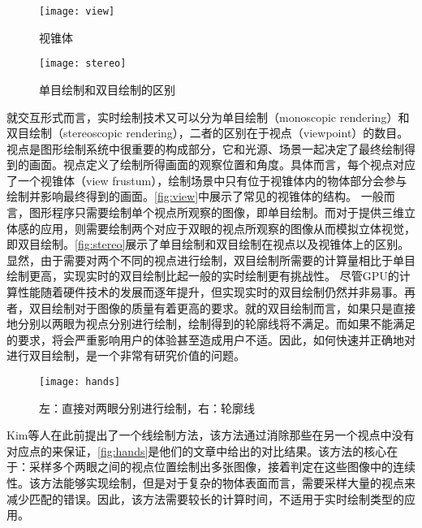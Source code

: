 \begin{figure}[tbh]
    \centering
    \texttt{[image: view]}
    \caption[视锥体]{\label{fig:view}
    视锥体\footnotemark}
\end{figure}

\begin{figure}[tbh]
    \centering
    \texttt{[image: stereo]}
    \caption[单目绘制和双目绘制的区别]{\label{fig:stereo}
    单目绘制和双目绘制的区别\footnotemark}
\end{figure}

就交互形式而言，实时绘制技术又可以分为单目绘制（monoscopic rendering）和双目绘制（stereoscopic rendering），二者的区别在于视点（viewpoint）的数目。视点是图形绘制系统中很重要的构成部分，它和光源、场景一起决定了最终绘制得到的画面。视点定义了绘制所得画面的观察位置和角度。具体而言，每个视点对应了一个视锥体（view frustum），绘制场景中只有位于视锥体内的物体部分会参与绘制并影响最终得到的画面。\autoref{fig:view}中展示了常见的视锥体的结构。
一般而言，图形程序只需要绘制单个视点所观察的图像，即单目绘制。而对于提供三维立体感的应用，则需要绘制两个对应于双眼的视点所观察的图像从而模拟立体视觉，即双目绘制。\autoref{fig:stereo}展示了单目绘制和双目绘制在视点以及视锥体上的区别。显然，由于需要对两个不同的视点进行绘制，双目绘制所需要的计算量相比于单目绘制更高，实现实时的双目绘制比起一般的实时绘制更有挑战性。
尽管GPU的计算性能随着硬件技术的发展而逐年提升，但实现实时的双目绘制仍然并非易事。再者，双目绘制对于图像的质量有着更高的要求。就\con{}的双目绘制而言，如果只是直接地分别以两眼为视点分别进行绘制，绘制得到的轮廓线将不满足\stcy{}。而如果不能满足\stcy{}的要求，将会严重影响用户的体验甚至造成用户不适。因此，如何快速并正确地对\con{}进行双目绘制，是一个非常有研究价值的问题。

\begin{figure}[tbh]
    \centering
    \texttt{[image: hands]}
    \caption[\stc{}轮廓线的示例]{\label{fig:hands}
    左：直接对两眼分别进行绘制，右：\stc{}轮廓线}
\end{figure}

Kim等人在此前提出了一个\stc{}线绘制方法\cite{kim2013stereoscopic}，该方法通过消除那些在另一个视点中没有对应点的\vdp{}来保证\stcy{}，\autoref{fig:hands}是他们的文章中给出的对比结果。该方法的核心在于：采样多个两眼之间的视点位置绘制出多张图像，接着判定\vdp{}在这些图像中的连续性。该方法能够实现\stc{}\vdl{}绘制，但是对于复杂的物体表面而言，需要采样大量的视点来减少匹配的错误。因此，该方法需要较长的计算时间，不适用于实时绘制类型的应用。

